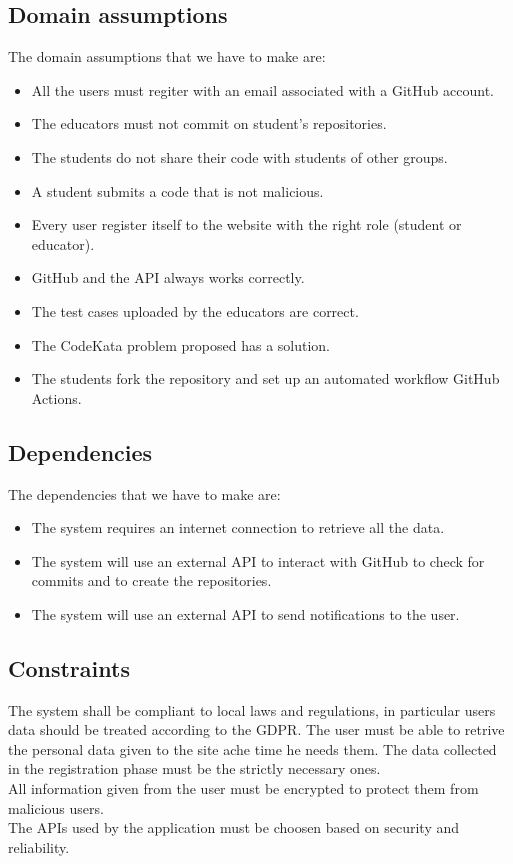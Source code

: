 \documentclass[12pt, a4paper]{report}
\begin{document}
    \subsection{Domain assumptions}
    The domain assumptions that we have to make are: 
    \begin{itemize}
        \item All the users must regiter with an email associated with a GitHub account. 
        \item The educators must not commit on student's repositories. 
        \item The students do not share their code with students of other groups. 
        \item A student submits a code that is not malicious. 
        \item Every user register itself to the website with the right role (student or educator).
        \item GitHub and the API always works correctly. 
        \item The test cases uploaded by the educators are correct. 
        \item The CodeKata problem proposed has a solution. 
        \item The students fork the repository and set up an automated workflow GitHub Actions. 
    \end{itemize}

    \subsection{Dependencies}
    The dependencies that we have to make are: 
    \begin{itemize}
        \item The system requires an internet connection to retrieve all the data. 
        \item The system will use an external API to interact with GitHub to check for commits and to create the repositories.
        \item The system will use an external API to send notifications to the user. 
    \end{itemize}

    \subsection{Constraints}
    The system shall be compliant to local laws and regulations, in particular users data should be treated according to the GDPR. 
    The user must be able to retrive the personal data given to the site ache time he needs them. 
    The data collected in the registration phase must be the strictly necessary ones. \\
    All information given from the user must be encrypted to protect them from malicious users. \\
    The APIs used by the application must be choosen based on security and reliability.
\end{document}
